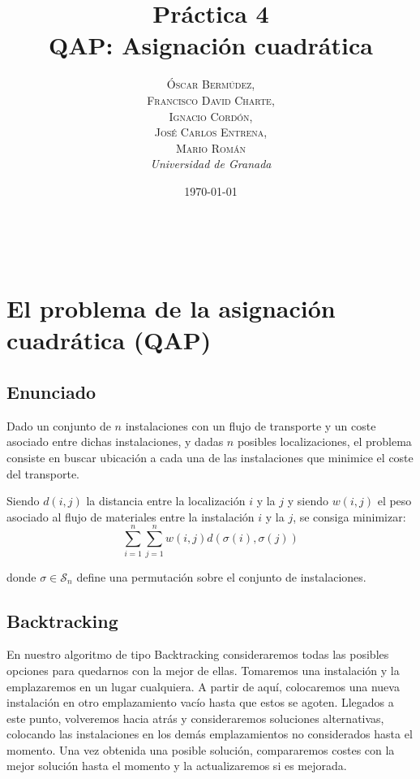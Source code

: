 \documentclass[a4paper, 11pt]{article} %
\title{\textbf{Práctica 4}\\ %
QAP: Asignación cuadrática} %
\author{\textsc{Óscar Bermúdez,\\Francisco David Charte,\\Ignacio Cordón,\\José Carlos Entrena,\\Mario Román} %
\\{\textit{Universidad de Granada}}} %
\date{\today} %
\makeatletter
\renewcommand{\maketitle}{ %
\begin{flushright} %
{\LARGE\@title} %

\vspace{50pt} %

{\large\@author} %
\\\@date %

\vspace{40pt} %
\end{flushright}
}
\makeatother
\begin{document}
\maketitle %

\renewcommand{\abstractname}{Resumen} %
\begin{abstract}
\end{abstract}
{\parskip=2pt
\tableofcontents
}
\pagebreak

\section{El problema de la asignación cuadrática (QAP)}
      \subsection{Enunciado}
	Dado un conjunto de $n$ instalaciones con un flujo de transporte y
	un coste asociado entre dichas instalaciones, y dadas $n$ posibles localizaciones,
	el problema consiste en buscar ubicación a cada una de las instalaciones que
	minimice el coste del transporte.
	
	Siendo $d(i,j)$ la distancia entre la localización $i$ y la $j$
	y siendo $w(i,j)$ el peso asociado al flujo de materiales entre la instalación
	$i$ y la $j$, se consiga minimizar:
	\begin{equation}
	\sum_{i=1}^n \sum_{j=1}^nw(i,j) d(\sigma(i),\sigma(j))
	\label{coste}
	\end{equation}

	donde $\sigma \in \mathcal{S}_n$ define una permutación sobre el conjunto de instalaciones.

    
      \subsection{Backtracking}
	En nuestro algoritmo de tipo Backtracking consideraremos todas las posibles opciones para quedarnos con la mejor de ellas.
	Tomaremos una instalación y la emplazaremos en un lugar cualquiera. A partir de aquí, colocaremos una nueva instalación
	en otro emplazamiento vacío hasta que estos se agoten. Llegados a este punto, volveremos hacia atrás y consideraremos soluciones alternativas, colocando las instalaciones en los demás emplazamientos no considerados hasta el momento. Una vez obtenida una posible solución, compararemos costes con la mejor solución hasta el momento y la actualizaremos si es mejorada.       
	
\end{document}
